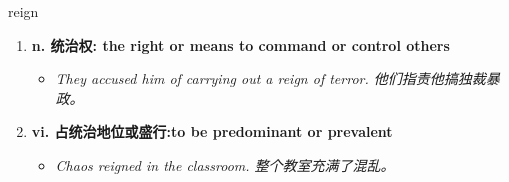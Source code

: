 
\begin{frame}
{\huge reign}
\begin{center}
\begin{enumerate}\Large
  \item \textbf{n. 统治权: the right or means to command or control others}
  \begin{itemize}
    \item \em{\Large{They accused him of carrying out a reign of terror. 他们指责他搞独裁暴政。}}
  \end{itemize}
  \item \textbf{vi. 占统治地位或盛行:to be predominant or prevalent}
  \begin{itemize}
    \item \em{\Large{Chaos reigned in the classroom. 整个教室充满了混乱。}}
  \end{itemize}
\end{enumerate}
\end{center}
\end{frame}
